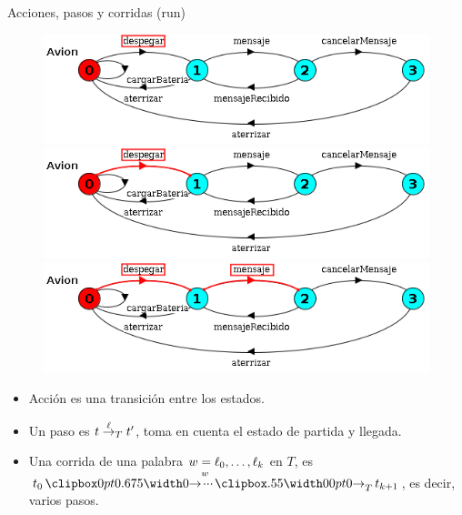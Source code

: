 \begin{frame}{Acciones, pasos y corridas (run)}
    \begin{figure}
        \begin{overprint}
        \includegraphics[width=\textwidth]{figures/1accion.png} 
        \includegraphics[width=\textwidth]{figures/2paso.png} 
        \includegraphics[width=\textwidth]{figures/3run.png} 
        \end{overprint}
    \end{figure}

    \begin{itemize}
     \item Acción es una transición entre los estados.
     \pause
     \item Un paso es $t \overset{\ell}{\rightarrow}_{T} t'$, toma en cuenta el estado de partida y llegada.
     \pause
     \item Una corrida de una palabra $w = \ell_0,\ldots,\ell_k$ en $T$, es $t_0 \runw{w}{T} t_{k+1}$, es decir, varios pasos.
    \end{itemize}
    
\end{frame}
